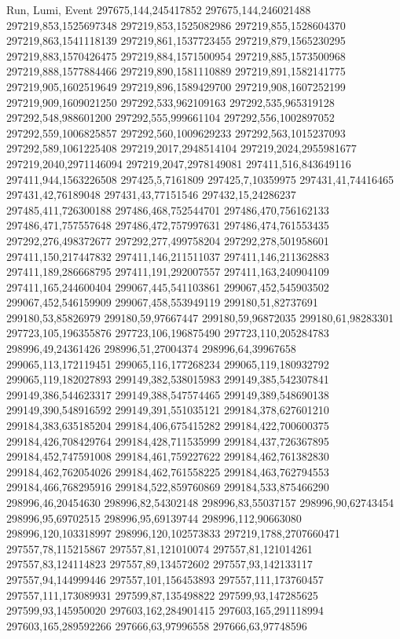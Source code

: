 Run, Lumi, Event
297675,144,245417852
297675,144,246021488
297219,853,1525697348
297219,853,1525082986
297219,855,1528604370
297219,863,1541118139
297219,861,1537723455
297219,879,1565230295
297219,883,1570426475
297219,884,1571500954
297219,885,1573500968
297219,888,1577884466
297219,890,1581110889
297219,891,1582141775
297219,905,1602519649
297219,896,1589429700
297219,908,1607252199
297219,909,1609021250
297292,533,962109163
297292,535,965319128
297292,548,988601200
297292,555,999661104
297292,556,1002897052
297292,559,1006825857
297292,560,1009629233
297292,563,1015237093
297292,589,1061225408
297219,2017,2948514104
297219,2024,2955981677
297219,2040,2971146094
297219,2047,2978149081
297411,516,843649116
297411,944,1563226508
297425,5,7161809
297425,7,10359975
297431,41,74416465
297431,42,76189048
297431,43,77151546
297432,15,24286237
297485,411,726300188
297486,468,752544701
297486,470,756162133
297486,471,757557648
297486,472,757997631
297486,474,761553435
297292,276,498372677
297292,277,499758204
297292,278,501958601
297411,150,217447832
297411,146,211511037
297411,146,211362883
297411,189,286668795
297411,191,292007557
297411,163,240904109
297411,165,244600404
299067,445,541103861
299067,452,545903502
299067,452,546159909
299067,458,553949119
299180,51,82737691
299180,53,85826979
299180,59,97667447
299180,59,96872035
299180,61,98283301
297723,105,196355876
297723,106,196875490
297723,110,205284783
298996,49,24361426
298996,51,27004374
298996,64,39967658
299065,113,172119451
299065,116,177268234
299065,119,180932792
299065,119,182027893
299149,382,538015983
299149,385,542307841
299149,386,544623317
299149,388,547574465
299149,389,548690138
299149,390,548916592
299149,391,551035121
299184,378,627601210
299184,383,635185204
299184,406,675415282
299184,422,700600375
299184,426,708429764
299184,428,711535999
299184,437,726367895
299184,452,747591008
299184,461,759227622
299184,462,761382830
299184,462,762054026
299184,462,761558225
299184,463,762794553
299184,466,768295916
299184,522,859760869
299184,533,875466290
298996,46,20454630
298996,82,54302148
298996,83,55037157
298996,90,62743454
298996,95,69702515
298996,95,69139744
298996,112,90663080
298996,120,103318997
298996,120,102573833
297219,1788,2707660471
297557,78,115215867
297557,81,121010074
297557,81,121014261
297557,83,124114823
297557,89,134572602
297557,93,142133117
297557,94,144999446
297557,101,156453893
297557,111,173760457
297557,111,173089931
297599,87,135498822
297599,93,147285625
297599,93,145950020
297603,162,284901415
297603,165,291118994
297603,165,289592266
297666,63,97996558
297666,63,97748596

